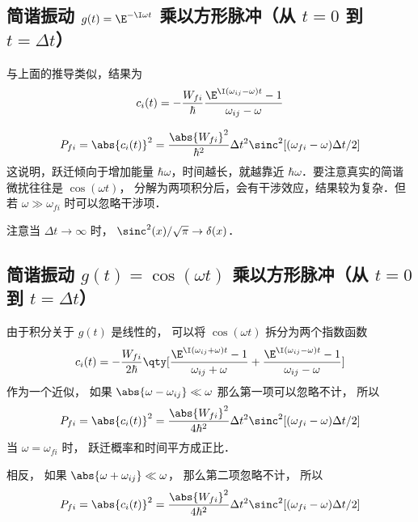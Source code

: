 \subsection{简谐振动 $g(t)= \E^{-\I\omega t}$ 乘以方形脉冲（从 $t=0$ 到 $t=\Delta t$）}
与上面的推导类似，结果为
\begin{equation}
c_i(t) = -\frac{W_{fi}}{\hbar} \frac{\E^{\I(\omega_{ij} - \omega)t} - 1}{\omega_{ij} - \omega}
\end{equation}

\begin{equation}
P_{fi} = \abs{c_i(t)}^2 = \frac{\abs{W_{fi}}^2}{\hbar^2} \Delta t^2 \sinc^2[(\omega_{fi}-\omega)\Delta t/2]
\end{equation}
这说明，跃迁倾向于增加能量 $\hbar\omega$，时间越长，就越靠近 $\hbar\omega$．要注意真实的简谐微扰往往是 $\cos(\omega t)$， 分解为两项积分后，会有干涉效应，结果较为复杂．但若 $\omega \gg \omega_{fi}$ 时可以忽略干涉项．

注意当 $\Delta t \to \infty$ 时， $\sinc^2(x)/\sqrt{\pi} \to \delta(x)$．

\subsection{简谐振动 $g(t)= \cos(\omega t)$ 乘以方形脉冲（从 $t=0$ 到 $t=\Delta t$）}
由于积分关于 $g(t)$ 是线性的， 可以将 $\cos(\omega t)$ 拆分为两个指数函数
\begin{equation}
c_i(t) = -\frac{W_{fi}}{2\hbar} \qty[\frac{\E^{\I(\omega_{ij} + \omega)t} - 1}{\omega_{ij} + \omega} + \frac{\E^{\I(\omega_{ij} - \omega)t} - 1}{\omega_{ij} - \omega}]
\end{equation}
作为一个近似， 如果 $\abs{\omega - \omega_{ij}} \ll \omega$ 那么第一项可以忽略不计， 所以
\begin{equation}\label{TDPEx_eq1}
P_{fi} = \abs{c_i(t)}^2 = \frac{\abs{W_{fi}}^2}{4\hbar^2} \Delta t^2 \sinc^2[(\omega_{fi}-\omega)\Delta t/2]
\end{equation}
当 $\omega = \omega_{fi}$ 时， 跃迁概率和时间平方成正比．

相反， 如果 $\abs{\omega + \omega_{ij}} \ll \omega$， 那么第二项忽略不计， 所以
\begin{equation}
P_{fi} = \abs{c_i(t)}^2 = \frac{\abs{W_{fi}}^2}{4\hbar^2} \Delta t^2 \sinc^2[(\omega_{fi}-\omega)\Delta t/2]
\end{equation}
